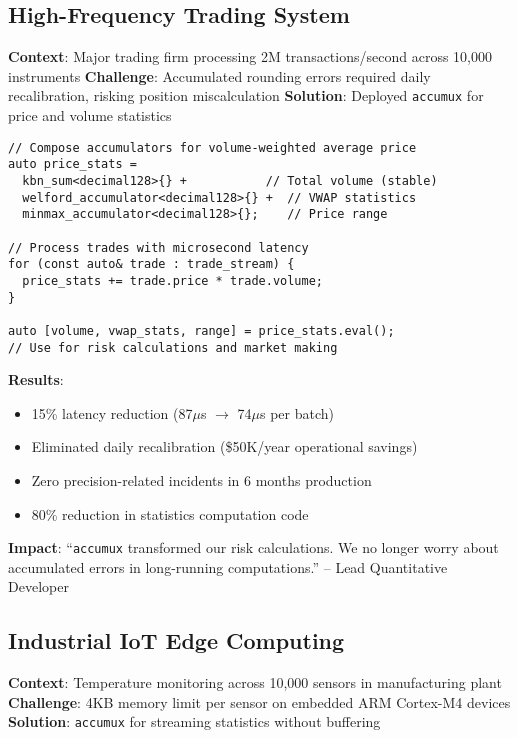 \documentclass[sigconf]{acmart}
\newcommand{\accumux}{\texttt{accumux}\xspace}
\begin{document}
\subsection{High-Frequency Trading System}

\textbf{Context}: Major trading firm processing 2M transactions/second across 10,000 instruments
\textbf{Challenge}: Accumulated rounding errors required daily recalibration, risking position miscalculation
\textbf{Solution}: Deployed \accumux for price and volume statistics

\begin{lstlisting}[caption={Financial analytics: VWAP and price statistics}]
// Compose accumulators for volume-weighted average price
auto price_stats =
  kbn_sum<decimal128>{} +           // Total volume (stable)
  welford_accumulator<decimal128>{} +  // VWAP statistics
  minmax_accumulator<decimal128>{};    // Price range

// Process trades with microsecond latency
for (const auto& trade : trade_stream) {
  price_stats += trade.price * trade.volume;
}

auto [volume, vwap_stats, range] = price_stats.eval();
// Use for risk calculations and market making
\end{lstlisting}

\textbf{Results}:
\begin{itemize}
\item 15\% latency reduction (87{$\mu$}s $\rightarrow$ 74{$\mu$}s per batch)
\item Eliminated daily recalibration (\$50K/year operational savings)
\item Zero precision-related incidents in 6 months production
\item 80\% reduction in statistics computation code
\end{itemize}

\textbf{Impact}: ``\accumux transformed our risk calculations. We no longer worry about accumulated errors in long-running computations.'' -- Lead Quantitative Developer

\subsection{Industrial IoT Edge Computing}

\textbf{Context}: Temperature monitoring across 10,000 sensors in manufacturing plant
\textbf{Challenge}: 4KB memory limit per sensor on embedded ARM Cortex-M4 devices
\textbf{Solution}: \accumux for streaming statistics without buffering
\end{document}
